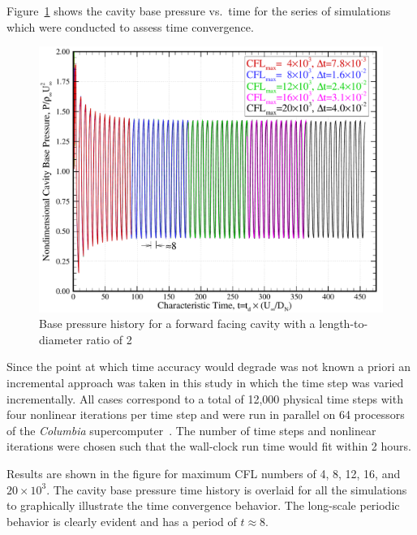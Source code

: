 Figure~\ref{fig:cavity_LD2_pressure_history} shows the cavity base pressure vs.\ time for the series of simulations which were conducted to assess time convergence.
\begin{figure}[hbtp]
  \begin{center}
    \includegraphics[width=\textwidth]{figures/sphere_cavity/LD_2.0/base_pressure_history}
    \caption{Base pressure history for a forward facing cavity with a length-to-diameter ratio of 2\label{fig:cavity_LD2_pressure_history}}
  \end{center}
\end{figure}
Since the point at which time accuracy would degrade was not known a priori an incremental approach was taken in this study in which the time step was varied incrementally.  All cases correspond to a total of 12,000 physical time steps with four nonlinear iterations per time step and were run in parallel on 64 processors of the \emph{Columbia} supercomputer~\cite{nas_columbia}.  The number of time steps and nonlinear iterations were chosen such that the wall-clock run time would fit within 2 hours.

Results are shown in the figure for maximum CFL numbers of 4, 8, 12, 16, and $20\times 10^3$.  The cavity base pressure time history is overlaid for all the simulations to graphically illustrate the time convergence behavior.  The long-scale periodic behavior is clearly evident and has a period of $\hat{t}\approx 8$.

